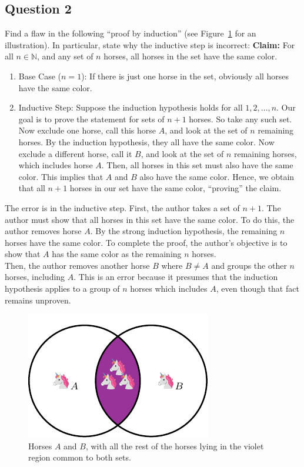 \subsection*{Question 2}
Find a flaw in the following ``proof by induction'' (see Figure~\ref{fig:horse} for an illustration). In particular, state why the inductive step is incorrect:
\vspace{0.5cm}
\noindent \textbf{Claim:} For all $n \in \mathbb{N}$, and any set of $n$ horses, all horses in the set have the same color.
\begin{enumerate}
    \item Base Case ($n=1$): If there is just one horse in the set, obviously all horses have the same color.
    \item Inductive Step: Suppose the induction hypothesis holds for all $1,2,\ldots,n$. Our goal is to prove the statement for sets of $n+1$ horses. So take any such set. Now exclude one horse, call this horse $A$, and look at the set of $n$ remaining horses. By the induction hypothesis, they all have the same color. Now exclude a different horse, call it $B$, and look at the set of $n$ remaining horses, which includes horse $A$. Then, all horses in this set must also have the same color. This implies that $A$ and $B$ also have the same color. Hence, we obtain that all $n+1$ horses in our set have the same color, ``proving'' the claim. 
\end{enumerate}
\begin{solution}
The error is in the inductive step. First, the author takes a set of $n+1$. The author must show that all horses in this set have the same color. To do this, the author removes horse $A$. By the strong induction hypothesis, the remaining $n$ horses have the same color. To complete the proof, the author's objective is to show that $A$ has the same color as the remaining $n$ horses.\\

Then, the author removes another horse $B$ where $B\neq A$ and groups the other $n$ horses, including $A$. This is an error because it presumes that the induction hypothesis applies to a group of $n$ horses which includes $A$, even though that fact remains unproven.
\end{solution}
\begin{figure}[h]
    \centering
    \includegraphics{images/horse_venn.pdf}
    \caption{Horses $A$ and $B$, with all the rest of the horses lying in the violet region common to both sets.}
    \label{fig:horse}
\end{figure}
\newpage
